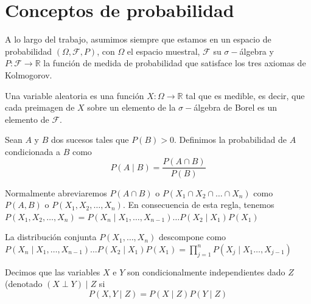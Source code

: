 \section{Conceptos de probabilidad}
A lo largo del trabajo, asumimos siempre que estamos en un espacio de probabilidad $(\Omega, \mathcal{F}, P)$, con $\Omega$ el espacio muestral, $\mathcal{F}$ su $\sigma-$álgebra y $P:\mathcal{F} \rightarrow \mathbb{R}$ la función de medida de probabilidad que satisface los tres axiomas de Kolmogorov.

\begin{defin}
Una variable aleatoria es una función $X:\Omega \rightarrow \mathbb{R}$ tal que es medible, es decir, que cada preimagen de $X$ sobre un elemento de la $\sigma-$álgebra de Borel es un elemento de $\mathcal{F}$.
\end{defin}

\begin{defin}
Sean $A$ y $B$ dos sucesos tales que $P(B) > 0$. Definimos la probabilidad de $A$ condicionada a $B$ como
\begin{equation*}
P(A \mid B) = \frac{P(A \cap B)}{P(B)}
\end{equation*}
\end{defin}
Normalmente abreviaremos $P(A \cap B)$ o $P(X_1 \cap X_2 \cap \ldots\cap X_n)$ como $P(A, B)$ o $P(X_1, X_2, \ldots, X_n)$. En consecuencia de esta regla, tenemos $P(X_1, X_2, \ldots, X_n) = P(X_n\mid X_1, \ldots, X_{n-1})\ldots P(X_2\mid X_1)P(X_1)$ 
\begin{teor}
\label{regla-del-producto}
La distribución conjunta $P(X_1, \ldots, X_n)$ descompone como $P(X_n\mid X_1, \ldots, X_{n-1})\ldots P(X_2\mid X_1)P(X_1) = \prod_{j=1}^n P(X_j\mid X_1\ldots, X_{j-1})$
\end{teor}
\begin{defin}
Decimos que las variables $X$ e $Y$ son condicionalmente independientes dado $Z$ (denotado $(X \perp Y) \mid Z$ si
\begin{equation*}
P(X, Y \mid Z) = P(X\mid Z)P(Y\mid Z)
\end{equation*}
\end{defin}

